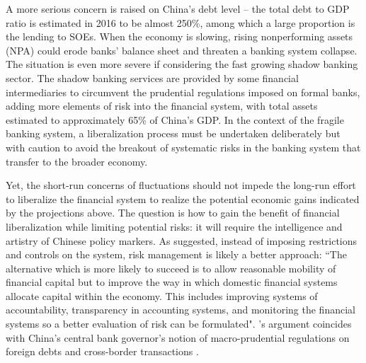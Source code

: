 \documentclass[AER]{AEA}
\begin{document}

A more serious concern is raised on China's debt level --
the total debt to GDP ratio is estimated in 2016 to be almost 250\%, 
among which a large proportion is the lending to SOEs.
When the economy is slowing, rising nonperforming 
assets (NPA) could erode banks' balance sheet and threaten a 
banking system collapse. The situation is even more 
severe if considering the fast growing shadow banking sector.
The shadow banking services are provided by some financial 
intermediaries to circumvent the prudential regulations imposed 
on formal banks, adding more elements of risk into the financial system, 
with total assets estimated to approximately 65\% of China's GDP. 
In the context of the fragile banking system, a liberalization 
process must be undertaken deliberately but with caution to avoid 
the breakout of systematic risks in the banking system that transfer 
to the broader economy.

Yet, the short-run concerns of fluctuations should not 
impede the long-run effort to liberalize the financial system 
to realize the potential economic gains indicated by the 
projections above.
The question is how to gain the benefit of financial 
liberalization while limiting potential risks:
it will require the intelligence and artistry of Chinese 
policy markers. 
As \cite{mckibbin1999} suggested, 
instead of imposing restrictions and controls on the 
system, risk management is likely a better approach:  
``The alternative which is more likely to succeed is to allow 
reasonable mobility of financial capital but to improve the way 
in which domestic financial systems allocate capital within the 
economy. This includes improving systems of accountability, 
transparency in accounting systems, and monitoring the financial 
systems so a better evaluation of risk can be formulated".
\citeauthor{mckibbin1999}'s argument coincides with China's central
bank governor's notion of macro-prudential regulations on foreign 
debts and cross-border transactions \citep{zhou2012}. %


\end{document}
